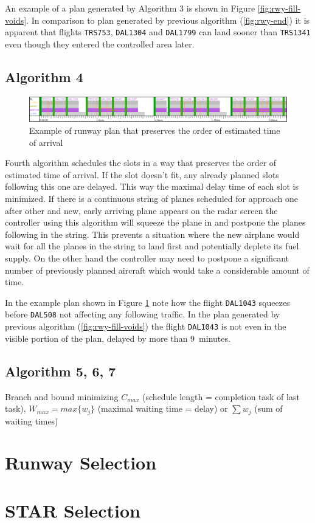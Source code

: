 An example of a plan generated by Algorithm 3 is shown in Figure \ref{fig:rwy-fill-voids}. In comparison to plan generated by previous algorithm (\ref{fig:rwy-end}) it is apparent that flights \texttt{TRS753}, \texttt{DAL1304} and \texttt{DAL1799} can land sooner than \texttt{TRS1341} even though they entered the controlled area later.

\subsection{Algorithm 4}

\begin{figure}[h]
    \centering
    \includegraphics[width=\textwidth]{figures/rwy-eta-order.png}
    \caption{Example of runway plan that preserves the order of estimated time of arrival}
    \label{fig:rwy-eta-order}
\end{figure}

Fourth algorithm schedules the slots in a way that preserves the order of estimated time of arrival. If the slot doesn't fit, any already planned slots following this one are delayed. This way the maximal delay time of each slot is minimized. If there is a continuous string of planes scheduled for approach one after other and new, early arriving plane appears on the radar screen the controller using this algorithm will squeeze the plane in and postpone the planes following in the string. This prevents a situation where the new airplane would wait for all the planes in the string to land first and potentially deplete its fuel supply. On the other hand the controller may need to postpone a significant number of previously planned aircraft which would take a considerable amount of time.

In the example plan shown in Figure \ref{fig:rwy-eta-order} note how the flight \texttt{DAL1043} squeezes before \texttt{DAL508} not affecting any following traffic. In the plan generated by previous algorithm (\ref{fig:rwy-fill-voids}) the flight \texttt{DAL1043} is not even in the visible portion of the plan, delayed by more than \mbox{9 minutes}.

\subsection{Algorithm 5, 6, 7}

Branch and bound minimizing $C_{max}$ (schedule length = completion task of last task), $W_{max} = max\{w_j\}$ (maximal waiting time = delay) or $\sum{w_j}$ (sum of waiting times) 

\section{Runway Selection}

\section{STAR Selection}
